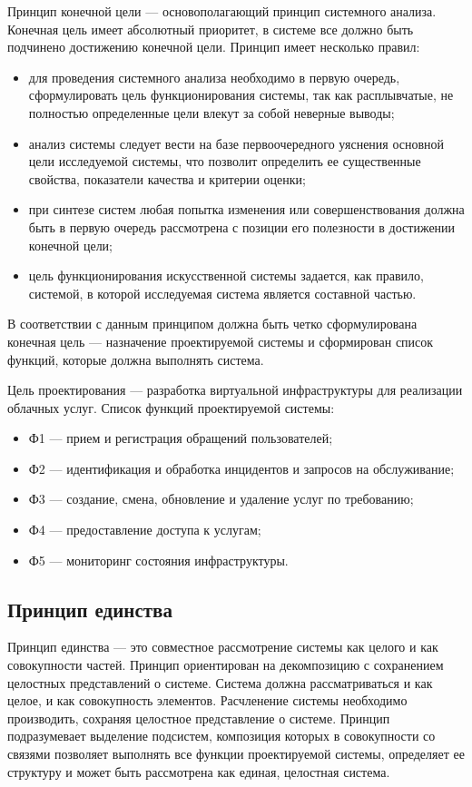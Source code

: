 Принцип конечной цели --- основополагающий принцип системного анализа.
Конечная цель имеет абсолютный приоритет, в системе все должно быть подчинено достижению конечной цели.
Принцип имеет несколько правил:
\begin{itemize}
  \item для проведения системного анализа необходимо в первую очередь, сформулировать цель функционирования системы, так как расплывчатые, не полностью определенные цели влекут за собой неверные выводы;
  \item анализ системы следует вести на базе первоочередного уяснения основной цели исследуемой системы, что позволит определить ее существенные свойства, показатели качества и критерии оценки;
  \item при синтезе систем любая попытка изменения или совершенствования должна быть в первую очередь рассмотрена с позиции его полезности в достижении конечной цели;
  \item цель функционирования искусственной системы задается, как правило, системой, в которой исследуемая система является составной частью.
\end{itemize}

В соответствии с данным принципом должна быть четко сформулирована конечная цель --- назначение проектируемой системы и сформирован список функций, которые должна выполнять система.

Цель проектирования --- разработка виртуальной инфраструктуры для реализации облачных услуг.
Список функций проектируемой системы:
\begin{itemize}
  \item Ф1 --- прием и регистрация обращений пользователей;
  \item Ф2 --- идентификация и обработка инцидентов и запросов на обслуживание;
  \item Ф3 --- создание, смена, обновление и удаление услуг по требованию;
  \item Ф4 --- предоставление доступа к услугам;
  \item Ф5 --- мониторинг состояния инфраструктуры.
\end{itemize}

\subsection{Принцип единства}

Принцип единства --- это совместное рассмотрение системы как целого и как совокупности частей.
Принцип ориентирован на декомпозицию с сохранением целостных представлений о системе.
Система должна рассматриваться и как целое, и как совокупность элементов.
Расчленение системы необходимо производить, сохраняя целостное представление о системе.
Принцип подразумевает выделение подсистем, композиция которых в совокупности со связями позволяет выполнять все функции проектируемой системы, определяет ее структуру и может быть рассмотрена как единая, целостная система.

